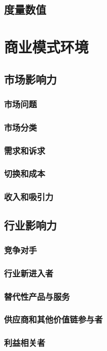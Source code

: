 \documentclass[a4paper]{ctexart}
\begin{document}
\subsection{度量数值}
\section{商业模式环境}
\subsection{市场影响力}
\subsubsection{市场问题}
\subsubsection{市场分类}
\subsubsection{需求和诉求}
\subsubsection{切换和成本}
\subsubsection{收入和吸引力}
\subsection{行业影响力}
\subsubsection{竞争对手}
\subsubsection{行业新进入者}
\subsubsection{替代性产品与服务}
\subsubsection{供应商和其他价值链参与者}
\subsubsection{利益相关者}
\end{document}
